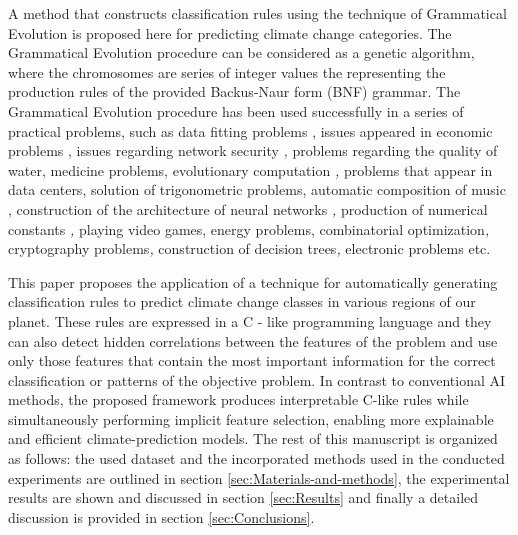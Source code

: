 \documentclass[12pt]{Definitions/academia}
\begin{document}
A method that constructs classification rules using the technique
of Grammatical Evolution \textit{\cite{O'Neill 2002}} is proposed
here for predicting climate change categories. The Grammatical Evolution
procedure can be considered as a genetic algorithm\textit{\cite{Kramer 2017}},
where the chromosomes are series of integer values the representing
the production rules of the provided Backus-Naur form (BNF) grammar\textit{\cite{Backus 1959}}.
The Grammatical Evolution procedure has been used successfully in
a series of practical problems, such as data fitting problems \textit{\cite{Ryan 1998,Neill 1999}},
issues appeared in economic problems \textit{\cite{Brabazon 2006}},
issues regarding network security \textit{\cite{Sen 2009},} problems
regarding the quality of water\textit{\cite{Chen 2008}}, medicine
problems\textit{\cite{Hidalgo 2014}}, evolutionary computation \textit{\cite{Tavares 2012},}
problems that appear in data centers\textit{\cite{Zapater 2016}},
solution of trigonometric problems\textit{\cite{Ryan 1998-1}}, automatic
composition of music \textit{\cite{de la Puente 2002}}, construction
of the architecture of neural networks \textit{\cite{De Campos 2016,Soltanian 2022},}
production of numerical constants \textit{\cite{Dempsey 2007},} playing
video games\textit{\cite{Galv=0000E1n-L=0000F3pez 2010,Shaker 2012}},
energy problems\textit{\cite{Mart=0000EDnez=002010Rodr=0000EDguez 2020}},
combinatorial optimization\textit{\cite{Sabar 2013},} cryptography
problems\textit{\cite{Ryan 2022},} construction of decision trees\textit{\cite{Pereira 2021},}
electronic problems\textit{\cite{Castej=0000F3n 2018} }etc.

This paper proposes the application of a technique for automatically
generating classification rules to predict climate change classes
in various regions of our planet. These rules are expressed in a C
- like programming language and they can also detect hidden correlations
between the features of the problem and use only those features that
contain the most important information for the correct classification
or patterns of the objective problem. In contrast to conventional
AI methods, the proposed framework produces interpretable C\nobreakdash-like
rules while simultaneously performing implicit feature selection,
enabling more explainable and efficient climate\nobreakdash-prediction
models.
The rest of this manuscript is organized as follows: the used dataset
and the incorporated methods used in the conducted experiments are
outlined in section \ref{sec:Materials-and-methods}, the experimental
results are shown and discussed in section \ref{sec:Results} and finally a
detailed discussion is provided in section \ref{sec:Conclusions}.
\end{document}
